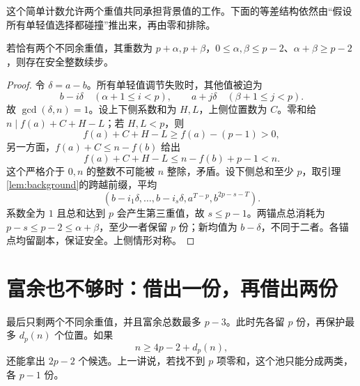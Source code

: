 这个简单计数允许两个重值共同承担背景值的工作。下面的等差结构依然由“假设所有单轻值选择都碰撞”推出来，再由零和排除。
\begin{lemma}[两个重值共享富余副本]\label{lem:two-heavy}
若恰有两个不同余重值，其重数为 $p+\alpha,p+\beta$，$0\le\alpha,\beta\le p-2$、$\alpha+\beta\ge p-2$，则存在安全整数续步。
\end{lemma}
\begin{proof}
令 $\delta=a-b$。所有单轻值调节失败时，其他值被迫为
\[
b-i\delta\quad(\alpha+1\le i<p),\qquad
a+j\delta\quad(\beta+1\le j<p).
\]
故 $\gcd(\delta,n)=1$。设上下侧系数和为 $H,L$，上侧位置数为 $C$。零和给 $n\mid f(a)+C+H-L$；若 $H,L<p$，则
\[
f(a)+C+H-L\ge f(a)-(p-1)>0,
\]
另一方面，$f(a)+C\le n-f(b)$ 给出
\[
f(a)+C+H-L\le n-f(b)+p-1<n.
\]
这个严格介于 $0,n$ 的整数不可能被 $n$ 整除，矛盾。设下侧总和至少 $p$，取引理\ref{lem:background}的跨越前缀，平均
\[(b-i_1\delta,\ldots,b-i_s\delta,a^{T-p},b^{2p-s-T}).
\]
系数全为 $1$ 且总和达到 $p$ 会产生第三重值，故 $s\le p-1$。两锚点总消耗为 $p-s\le p-2\le\alpha+\beta$，至少一者保留 $p$ 份；新均值为 $b-\delta$，不同于二者。各锚点均留副本，保证安全。上侧情形对称。
\end{proof}

\section{富余也不够时：借出一份，再借出两份}
最后只剩两个不同余重值，并且富余总数最多 $p-3$。此时先各留 $p$ 份，再保护最多 $d_p(n)$ 个位置。如果
\[n\ge4p-2+d_p(n),
\]
还能拿出 $2p-2$ 个候选。上一讲说，若找不到 $p$ 项零和，这个池只能分成两类，各 $p-1$ 份。

